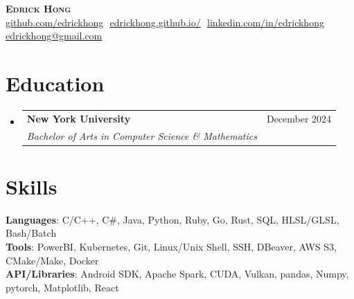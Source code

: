\documentclass[letterpaper,11pt]{article}
\makeatletter
\newcommand{\resumeSubheading}[4]{
  \vspace{-2pt}\item
    \begin{tabular*}{0.97\textwidth}[t]{l@{\extracolsep{\fill}}r}
      \textbf{#1} & #2 \\
      \textit{\small#3} & \textit{\small #4} \\
    \end{tabular*}\vspace{-7pt}
}
\newcommand{\resumeSubHeadingListStart}{\begin{itemize}[leftmargin=0.15in, label={}]}
\newcommand{\resumeSubHeadingListEnd}{\end{itemize}}
\makeatother
\begin{document}
\begin{flushright}
  \vspace{-4pt}
  \color{gray}
  \item
\end{flushright}

\vspace{-7pt}

\begin{center}
    \textbf{\Huge \scshape Edrick Hong} \\ \vspace{8pt}
    \small 
    \href{https://github.com/edrickhong}{\underline{github.com/edrickhong}} $  $
    \href{https://github.com/edrickhong/project_pages/wiki}
    {\underline{edrickhong.github.io/}} $  $
    \href{https://www.linkedin.com/in/edrick-hong-966abb244/}{\underline{linkedin.com/in/edrickhong}} $  $
    \href{mailto:edrickhong@gmail.com}
    {\underline{edrickhong@gmail.com}}
\end{center}

\section{Education}
  \resumeSubHeadingListStart
  
    \resumeSubheading
      {New York University}{December 2024}
      {Bachelor of Arts in Computer Science \& Mathematics}{}
  \resumeSubHeadingListEnd

\section{Skills}
 \begin{itemize}[leftmargin=0.15in, label={}]
    \small{\item{
    
     \textbf{Languages}{: C/C++, C\#, Java, Python, Ruby, Go, Rust, SQL, HLSL/GLSL, Bash/Batch} \\
     
     \textbf{Tools}{: PowerBI, Kubernetes, Git, Linux/Unix Shell, SSH, DBeaver, AWS S3, CMake/Make, Docker} \\
     
      \textbf{API/Libraries}{: Android SDK, Apache Spark, CUDA, Vulkan, pandas, Numpy, pytorch, Matplotlib, React} \\
     
    }}
 \end{itemize}
\end{document}
